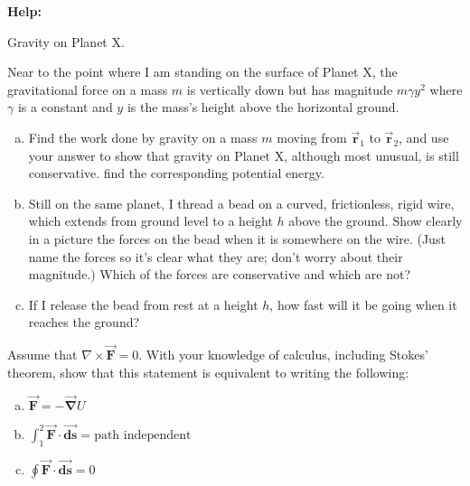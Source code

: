 \documentclass[11pt,letterpaper,boxed]{../hmcpsetrhino}
\let\oldvec\vec
\renewcommand{\vec}[1]{\oldvec{\mathbf{#1}}}
\begin{document}
\textbf{Help:} 

\begin{problem}[i]
Gravity on Planet X.\\
\begin{problem}[4.7]
Near to the point where I am standing on the surface of Planet X, the gravitational force on a mass $m$ is vertically down but has magnitude $m \gamma y^2$ where $\gamma$ is a constant and $y$ is the mass's height above the horizontal ground. 
\begin{enumerate}[(a)]
\item Find the work done by gravity on a mass $m$ moving from $\vec r_1$ to $\vec r_2$, and use your answer to show that gravity on Planet X, although most unusual, is still conservative. find the corresponding potential energy.
\item Still on the same planet, I thread a bead on a curved, frictionless, rigid wire, which extends from ground level to a height $h$ above the ground. Show clearly in a picture the forces on the bead when it is somewhere on the wire. (Just name the forces so it's clear what they are; don't worry about their magnitude.) Which of the forces are conservative and which are not?
\item If I release the bead from rest at a height $h$, how fast will it be going when it reaches the ground?
\end{enumerate}
\end{problem}
\vspace{-0.45cm}
\end{problem}

\begin{solution}

\vfill
\end{solution}

\newpage 

\begin{problem}[ii]
Assume that $\nabla \times \vec F = 0$. With your knowledge of calculus, including Stokes' theorem, show that this statement is equivalent to writing the following:

\begin{enumerate}[(a)]
\item $\vec F = - \vec{\nabla} U$

\item $\int_1^2 \vec{F} \cdot \vec{ds} = \text{path independent}$

\item $\oint \vec F \cdot \vec{ds} = 0$

\end{enumerate}

\end{problem}
\end{document}
